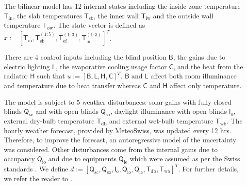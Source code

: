 
The bilinear model has 12 internal states including the inside zone temperature $\mathsf{T}_{\mathrm{in}}$, the slab temperatures $\mathsf{T}_{\mathrm{sb}}$, the inner wall $\mathsf{T}_{\mathrm{iw}}$ and the outside wall temperature $\mathsf{T}_{\mathrm{ow}}$. The state vector is defined as $x:=[\mathsf{T}_{\mathrm{in}}, \mathsf{T}_{\mathrm{sb}}^{(1:5)}, \mathsf{T}_{\mathrm{ef}}^{(1:3)}, \mathsf{T}_{\mathrm{in}}^{(1:3)}]^T$.

There are 4 control inputs including the blind position $\mathsf{B}$, the gains due to electric lighting $\mathsf{L}$, the evaporative cooling usage factor $\mathsf{C}$, and the heat from the radiator $\mathsf{H}$ such that $u:=[\mathsf{B},\mathsf{L},\mathsf{H},\mathsf{C}]^T$. $\mathsf{B}$ and $\mathsf{L}$ affect both room illuminance and temperature due to heat transfer whereas $\mathsf{C}$ and $\mathsf{H}$ affect only temperature.

The model is subject to 5 weather disturbances: solar gains with fully closed blinds $\mathsf{Q}_{\mathrm{sc}}$ and with open blinds $\mathsf{Q}_{\mathrm{so}}$, daylight illuminance with open blinds $\mathsf{I}_{\mathrm{o}}$, external dry-bulb temperature $\mathsf{T}_{\mathrm{db}}$ and external wet-bulb temperature $\mathsf{T}_{\mathrm{wb}}$. 
The hourly weather forecast, provided by MeteoSwiss, was updated every 12 hrs. Therefore, to improve the forecast,  an autoregressive model of the uncertainty was considered.
Other disturbances come from the internal gains due to occupancy $\mathsf{Q}_{\mathrm{io}}$ and due to equipments $\mathsf{Q}_{\mathrm{ie}}$ which were assumed as per the Swiss standards \cite{Merkblatt2006}. We define $d:=[\mathsf{Q}_{\mathrm{sc}},\mathsf{Q}_{\mathrm{so}},\mathsf{I}_{\mathrm{o}},\mathsf{Q}_{\mathrm{io}},\mathsf{Q}_{\mathrm{ie}},\mathsf{T}_{\mathrm{db}},\mathsf{T}_{\mathrm{wb}}]^T$. For further details, we refer the reader to \cite{Oldewurtel2011}.

